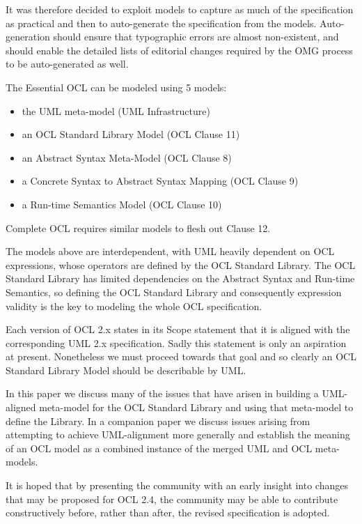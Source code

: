 \documentclass{eceasst}
\begin{document}
It was therefore decided to exploit models to capture as much of the specification as practical and then to auto-generate the specification from the models. Auto-generation should ensure that typographic errors are almost non-existent, and should enable the detailed lists of editorial changes required by the OMG process to be auto-generated as well.

The Essential OCL can be modeled using 5 models:
\begin{itemize}
\item the UML meta-model (UML Infrastructure)
\item an OCL Standard Library Model (OCL Clause 11)
\item an Abstract Syntax Meta-Model (OCL Clause 8)
\item a Concrete Syntax to Abstract Syntax Mapping (OCL Clause 9)
\item a Run-time Semantics Model (OCL Clause 10)
\end{itemize}

Complete OCL requires similar models to flesh out Clause 12.

The models above are interdependent, with UML heavily dependent on OCL expressions, whose operators are defined by the OCL Standard Library. The OCL Standard Library has limited dependencies on the Abstract Syntax and Run-time Semantics, so defining the OCL Standard Library and consequently expression validity is the key to modeling the whole OCL specification.

Each version of OCL 2.x states in its Scope statement that it is aligned with the corresponding UML 2.x specification. Sadly this statement is only an aspiration at present. Nonetheless we must proceed towards that goal and so clearly an OCL Standard Library Model should be describable by UML.

In this paper we discuss many of the issues that have arisen in building a UML-aligned meta-model for the OCL Standard Library and using that meta-model to define the Library. In a companion paper\cite{OCL-UML} we discuss issues arising from attempting to achieve UML-alignment more generally and establish the meaning of an OCL model as a combined instance of the merged UML and OCL meta-models.

It is hoped that by presenting the community with an early insight into changes that may be proposed for OCL 2.4, the community may be able to contribute constructively before, rather than after, the revised specification is adopted.
\end{document}
